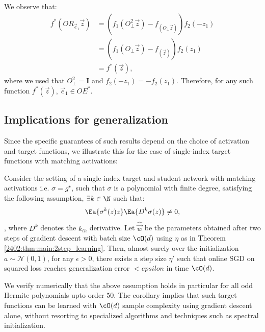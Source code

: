 We observe that:
\begin{align*}
    f^*(O R_{\vec{e}_1}\vec{z}) &= (f_1(O^2_\perp\vec{z})-f_(O_\perp\vec{z}))f_2(-z_1)\\
    &= (f_1(O_\perp\vec{z})-f_(\vec{z}))f_2(z_1)\\
    &= f^*(\vec{z}),
\end{align*}
where we used that $O^2_\perp = \mathbf{I}$ and $f_2(-z_1)=-f_2(z_1)$. Therefore, for any such function $f^*(\vec{z})$, $\vec{e}_1 \in OE^*$. 






\subsection{Implications for generalization} \label{2402:sec:app:gen_error}
Since the specific guarantees of such results depend on the choice of activation and target functions, we illustrate this for the case of single-index target functions with matching activations:
\begin{corollary}
Consider the setting of a single-index target and student network with matching activations i.e. $\sigma=g^\star$, such that $\sigma$ is a polynomial with finite degree, satisfying the following assumption, $\exists k \in \N$ such that:
\begin{equation}\label{2402:eq:matching}
    \Ea{\sigma^k(z)z}\Ea{D^k\sigma(z)} \neq 0, 
\end{equation},
where $D^k$ denotes the $k_{th}$ derivative.
Let $\hat{\vec{w}}$ be the parameters obtained after two steps of gradient descent with batch size $\cO(d)$ using $\eta$ as in Theorem \ref{2402:thm:main:2step_learning}. Then, almost surely over the initialization $a \sim \mathcal{N}(0,1)$, for any $\epsilon > 0$, there exists a step size $\eta'$ such that online SGD on 
squared loss reaches generalization error $<epsilon$ in time $\cO(d)$. 
\end{corollary}


We verify numerically that the above assumption holds in particular for all odd Hermite polynomials upto order $50$.
The corollary implies that such target functions can be learned with $\cO(d)$ sample complexity using gradient descent alone, without resorting to specialized algorithms and techniques such as spectral initialization.



